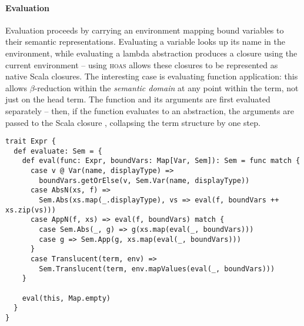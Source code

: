 \documentclass[../../../main.tex]{subfiles}
\begin{document}
\paragraph{Evaluation}
Evaluation proceeds by carrying an environment mapping bound variables to their semantic representations.
Evaluating a variable looks up its name in the environment, while evaluating a lambda abstraction produces a closure using the current environment -- using \textsc{hoas} allows these closures to be represented as native Scala closures.
The interesting case is evaluating function application: this allows $\beta$-reduction within the \emph{semantic domain} at any point within the term, not just on the head term.
The function and its arguments are first evaluated separately -- then, if the function evaluates to an abstraction, the arguments are passed to the Scala closure , collapsing the term structure by one step.
%
\begin{verbatim}
trait Expr {
  def evaluate: Sem = {
    def eval(func: Expr, boundVars: Map[Var, Sem]): Sem = func match {
      case v @ Var(name, displayType) =>
        boundVars.getOrElse(v, Sem.Var(name, displayType))
      case AbsN(xs, f) =>
        Sem.Abs(xs.map(_.displayType), vs => eval(f, boundVars ++ xs.zip(vs)))
      case AppN(f, xs) => eval(f, boundVars) match {
        case Sem.Abs(_, g) => g(xs.map(eval(_, boundVars)))
        case g => Sem.App(g, xs.map(eval(_, boundVars)))
      }
      case Translucent(term, env) =>
        Sem.Translucent(term, env.mapValues(eval(_, boundVars)))
    }

    eval(this, Map.empty)
  }
}
\end{verbatim}
%
\end{document}
